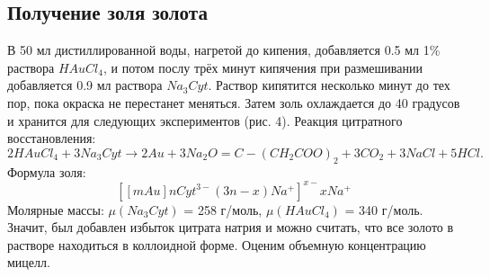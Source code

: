 \documentclass[a4paper, 12pt]{article}
\begin{document}
\subsection{Получение золя золота}
В 50 мл дистиллированной воды, нагретой до кипения, добавляется 0.5 мл 1\% раствора $HAuCl_{4}$, и потом послу трёх минут кипячения при размешивании добавляется 0.9 мл раствора $Na_{3}Cyt$. Раствор кипятится несколько минут до тех пор, пока окраска не перестанет меняться. Затем золь охлаждается до 40 градусов и хранится для следующих экспериментов (рис. 4). 
Реакция цитратного восстановления:
$$2HAuCl_{4} + 3Na_{3}Cyt\rightarrow 2Au+3Na_{2}O=C-(CH_{2}COO)_{2}+3CO_{2}+3NaCl+5HCl.$$
Формула золя:
$$[ [m Au ] nCyt^{3-}(3n - x)Na^{+}]^{x-} xNa^{+}$$
Молярные массы: $\mu(Na_{3}Cyt)$ = 258 г/моль, $\mu(HAuCl_{4})$ = 340 г/моль. Значит, был добавлен избыток цитрата натрия и можно считать, что все золото в растворе находиться в коллоидной форме. Оценим объемную концентрацию мицелл.
\end{document}

